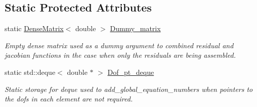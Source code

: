 \subsection*{Static Protected Attributes}
\begin{DoxyCompactItemize}
\item 
static \hyperlink{classoomph_1_1DenseMatrix}{Dense\+Matrix}$<$ double $>$ \hyperlink{classoomph_1_1GeneralisedElement_a4bff11b8ff97aefabb2df41e61e1779f}{Dummy\+\_\+matrix}
\begin{DoxyCompactList}\small\item\em Empty dense matrix used as a dummy argument to combined residual and jacobian functions in the case when only the residuals are being assembled. \end{DoxyCompactList}\item 
static std\+::deque$<$ double $\ast$ $>$ \hyperlink{classoomph_1_1GeneralisedElement_aa39d74bcbf019835d645ac07503f3232}{Dof\+\_\+pt\+\_\+deque}
\begin{DoxyCompactList}\small\item\em Static storage for deque used to add\+\_\+global\+\_\+equation\+\_\+numbers when pointers to the dofs in each element are not required. \end{DoxyCompactList}\end{DoxyCompactItemize}
